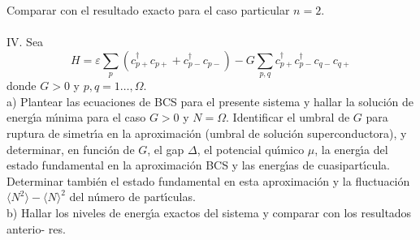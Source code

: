 \documentclass[12pt]{article}
\begin{document}
Comparar con el resultado exacto para el caso particular $n=2$. \\ \\
IV. Sea  
\[H=\varepsilon\sum_p (c^\dagger_{p+}c_{p+}+c^\dagger_{p-}c_{p-})-
G\sum_{p, q}c^\dagger_{p+}c^\dagger_{p-}c_{q-}c_{q+}\]
donde $G>0$ y $p,q=1\ldots,\Omega$. \\
a) Plantear las ecuaciones de BCS para el presente sistema 
y hallar la soluci\'on de energ\'{\i}a m\'{\i}nima para el caso 
$G>0$ y $N=\Omega$. Identificar el 
umbral de $G$ para ruptura de simetr\'{\i}a en la aproximaci\'on (umbral de soluci\'on superconductora), 
y determinar, en funci\'on de $G$, el gap $\Delta$, el potencial qu\'{\i}mico $\mu$,  la energ\'{\i}a del estado fundamental en la aproximaci\'on BCS y las energ\'{\i}as de cuasipart\'{\i}cula. Determinar tambi\'en 
el estado fundamental en esta aproximaci\'on y la fluctuaci\'on $\langle N^2\rangle-\langle N\rangle^2$ 
del n\'umero de part\'{\i}culas. \\
b) Hallar los niveles de energ\'{\i}a exactos del sistema y comparar con los resultados anterio- res.\\ \\
\end{document}
